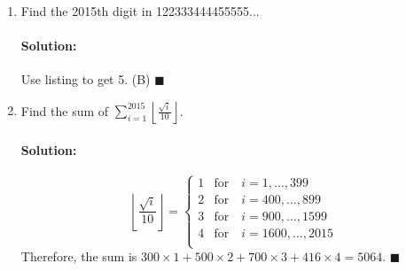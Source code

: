 \documentclass{article}
\newcommand{\floor}[1]{\ensuremath{\left\lfloor #1\right\rfloor}}
\newenvironment{solution}{\paragraph{Solution:}}{\hfill$\blacksquare$}
\begin{document}
\begin{enumerate}
	\item Find the 2015th digit in 122333444455555...
	
	\begin{solution}
		Use listing to get 5. (B)
	\end{solution}
	
	\item Find the sum of $\displaystyle \sum_{i=1}^{2015}\left\lfloor \frac{\sqrt{i}}{10}\right\rfloor$.
	
	\begin{solution}
		\begin{equation}
		\floor{\frac{\sqrt{i}}{10}} =
			\begin{cases}
			 1 & \text{for}\quad i=1,..., 399\\
			 2 & \text{for}\quad i=400,..., 899\\
			 3 & \text{for}\quad i=900,..., 1599\\
			 4 & \text{for}\quad i=1600,..., 2015\\
			\end{cases}
		\end{equation}
		Therefore, the sum is $300\times 1+ 500\times 2+700\times3 + 416\times 4=5064$.
	\end{solution}
	\end{enumerate}
	
	
\end{document}
